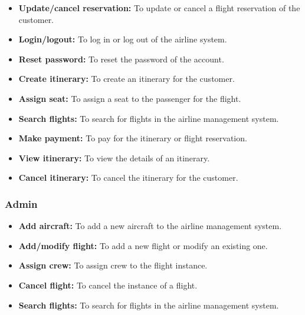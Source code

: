 \begin{itemize}
\item
\protect{}\label{W-c0d61XgzCu3jQ8Z4OoK}
\textbf{Update/cancel reservation:} To update or cancel a flight reservation of the customer.
\item
\protect{}\label{dq7_6PYj5RuAZVepIKpN-}
\textbf{Login/logout:} To log in or log out of the airline system.
\item
\protect{}\label{rhd2TNPBizQgOlEDQxNDm}
\textbf{Reset password:} To reset the password of the account.
\item
\protect{}\label{eJOmy4MX4wP5hxDupV4Ph}
\textbf{Create itinerary:} To create an itinerary for the customer.
\item
\protect{}\label{IupyLlUnC1QHBxioHlF8s}
\textbf{Assign seat:} To assign a seat to the passenger for the flight.
\item
\protect{}\label{zyi-Y6Tv9PkfWkcV1zxdF}
\textbf{Search flights:} To search for flights in the airline management system.
\item
\protect{}\label{4gG-2puZG9sxX-aZfy198}
\textbf{Make payment:} To pay for the itinerary or flight reservation.
\item
\protect{}\label{MnsE364yWxhaNrF6abc8t}
\textbf{View itinerary:} To view the details of an itinerary.
\item
\protect{}\label{wO_ohglhAKdEr_KFgehG9}
\textbf{Cancel itinerary:} To cancel the itinerary for the customer.
\end{itemize}

\subsubsection{Admin}\label{8A_xcIcFIDRVmaOZk3JU1}

\begin{itemize}
\item
\protect{}\label{piRhPMxRPq7UMir-lUEb1}
\textbf{Add aircraft:} To add a new aircraft to the airline management system.
\item
\protect{}\label{kinjxuJTkjpGypa_OClFL}
\textbf{Add/modify flight:} To add a new flight or modify an existing one.
\item
\protect{}\label{JbQPZciNkUJt1rnn9mM0c}
\textbf{Assign crew:} To assign crew to the flight instance.
\item
\protect{}\label{EIknZG6hABeLkLPsKNzFI}
\textbf{Cancel flight:} To cancel the instance of a flight.
\item
\protect{}\label{y0ysieO-xy4KgUpNHr_PX}
\textbf{Search flights:} To search for flights in the airline management system.
\end{itemize}

